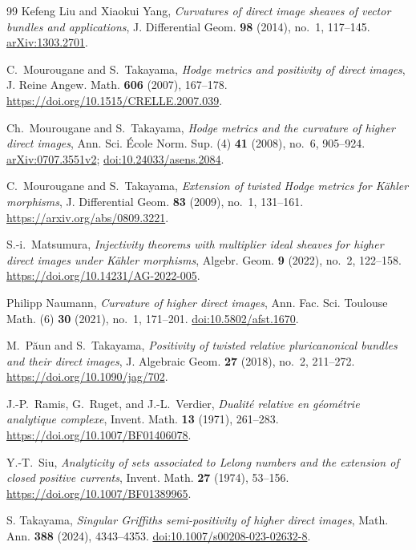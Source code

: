 \documentclass[11pt,reqno]{amsart}
\numberwithin{equation}{section}
\theoremstyle{definition}
\theoremstyle{remark}
\begin{document}
\begin{thebibliography}{99}
Kefeng Liu and Xiaokui Yang, \emph{Curvatures of direct image sheaves of vector bundles and applications}, J. Differential Geom. \textbf{98} (2014), no.~1, 117--145. \href{https://arxiv.org/abs/1303.2701}{arXiv:1303.2701}.

C.~Mourougane and S.~Takayama,
\emph{Hodge metrics and positivity of direct images},
J. Reine Angew. Math. \textbf{606} (2007), 167--178.
\url{https://doi.org/10.1515/CRELLE.2007.039}.

Ch.~Mourougane and S.~Takayama,
\emph{Hodge metrics and the curvature of higher direct images},
Ann. Sci. \'Ecole Norm. Sup. (4) \textbf{41} (2008), no.~6, 905--924.
\href{https://arxiv.org/abs/0707.3551}{arXiv:0707.3551v2};
\href{https://doi.org/10.24033/asens.2084}{doi:10.24033/asens.2084}.

C.~Mourougane and S.~Takayama,
\emph{Extension of twisted Hodge metrics for K\"ahler morphisms},
J. Differential Geom. \textbf{83} (2009), no.~1, 131--161.
\url{https://arxiv.org/abs/0809.3221}.

S.-i.~Matsumura,
\emph{Injectivity theorems with multiplier ideal sheaves for higher
direct images under K\"ahler morphisms},
Algebr. Geom. \textbf{9} (2022), no.~2, 122--158.
\url{https://doi.org/10.14231/AG-2022-005}.

Philipp Naumann, \emph{Curvature of higher direct images}, Ann. Fac. Sci. Toulouse Math. (6) \textbf{30} (2021), no.~1, 171--201. \href{https://doi.org/10.5802/afst.1670}{doi:10.5802/afst.1670}.

M.~P\u aun and S.~Takayama,
\emph{Positivity of twisted relative pluricanonical bundles and their
direct images},
J. Algebraic Geom. \textbf{27} (2018), no.~2, 211--272.
\url{https://doi.org/10.1090/jag/702}.

J.-P.~Ramis, G.~Ruget, and J.-L.~Verdier,
\emph{Dualit\'e relative en g\'eom\'etrie analytique complexe},
Invent. Math. \textbf{13} (1971), 261--283.
\url{https://doi.org/10.1007/BF01406078}.

Y.-T.~Siu,
\emph{Analyticity of sets associated to Lelong numbers and the extension
of closed positive currents},
Invent. Math. \textbf{27} (1974), 53--156.
\url{https://doi.org/10.1007/BF01389965}.

S. Takayama, \emph{Singular Griffiths semi-positivity of higher direct images}, Math. Ann. \textbf{388} (2024), 4343--4353. \href{https://doi.org/10.1007/s00208-023-02632-8}{doi:10.1007/s00208-023-02632-8}.


\end{thebibliography}
\end{document}
